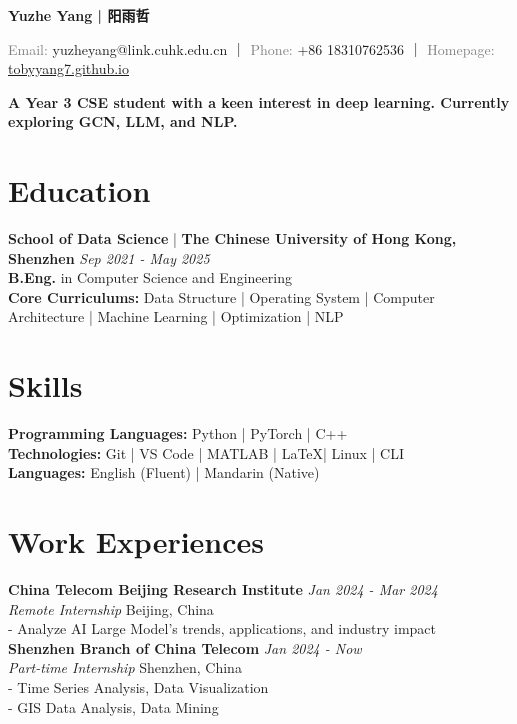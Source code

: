 \documentclass[a4paper,10pt]{article}
\newcommand{\contact}[2]{\noindent\textcolor{gray}{#1:} #2}
\begin{document}
\newcommand{\name}[1]{\noindent\textbf{\LARGE #1}\vspace{0.5em}}

\begin{center}
    
\name{Yuzhe Yang | 阳雨哲}

\contact{Email}{yuzheyang@link.cuhk.edu.cn} ｜ \contact{Phone}{+86 18310762536} ｜ \contact{Homepage}{\href{https://tobyyang7.github.io/}{tobyyang7.github.io}}

\vspace*{.2em}
\textbf{A Year 3 CSE student with a keen interest in deep learning. Currently exploring GCN, LLM, and NLP.\\}

\end{center}

\section*{Education}
\textbf{School of Data Science} | \textbf{The Chinese University of Hong Kong, Shenzhen} \hfill \textit{Sep 2021 - May 2025}\\
\textbf{B.Eng.} in Computer Science and Engineering\\
\textbf{Core Curriculums:}
Data Structure | Operating System |  Computer Architecture |  Machine Learning | Optimization |  NLP


\section*{Skills}
\textbf{Programming Languages:} Python | PyTorch | C++\\
\textbf{Technologies:} Git | VS Code | MATLAB | \LaTeX | Linux | CLI\\
\textbf{Languages:} English (Fluent) | Mandarin (Native)

\section*{Work Experiences}
\textbf{China Telecom Beijing Research Institute} \hfill \textit{Jan 2024 - Mar 2024}\\
\textit{Remote Internship} \hfill Beijing, China\\
- Analyze AI Large Model's trends, applications, and industry impact\\
\textbf{Shenzhen Branch of China Telecom} \hfill \textit{Jan 2024 - Now}\\
\textit{Part-time Internship} \hfill Shenzhen, China\\
- Time Series Analysis, Data Visualization\\
- GIS Data Analysis, Data Mining
\end{document}
